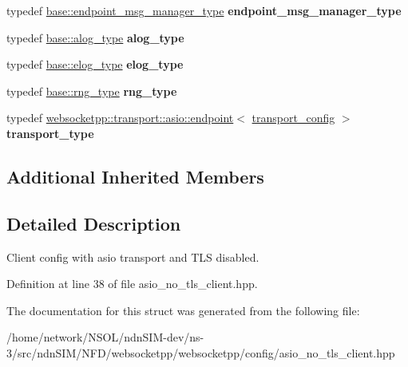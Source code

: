 \begin{DoxyCompactItemize}
\item 
typedef \hyperlink{classwebsocketpp_1_1message__buffer_1_1alloc_1_1endpoint__msg__manager}{base\+::endpoint\+\_\+msg\+\_\+manager\+\_\+type} {\bfseries endpoint\+\_\+msg\+\_\+manager\+\_\+type}\hypertarget{structwebsocketpp_1_1config_1_1asio__client_aaeb34609830b9038bff2bbe3fec9d420}{}\label{structwebsocketpp_1_1config_1_1asio__client_aaeb34609830b9038bff2bbe3fec9d420}

\item 
typedef \hyperlink{classwebsocketpp_1_1log_1_1basic}{base\+::alog\+\_\+type} {\bfseries alog\+\_\+type}\hypertarget{structwebsocketpp_1_1config_1_1asio__client_af6deeb2d0492bb8680b4e030fd201185}{}\label{structwebsocketpp_1_1config_1_1asio__client_af6deeb2d0492bb8680b4e030fd201185}

\item 
typedef \hyperlink{structwebsocketpp_1_1config_1_1core__client_a24f1bae9e8a92bf7950153ed39eaffb8}{base\+::elog\+\_\+type} {\bfseries elog\+\_\+type}\hypertarget{structwebsocketpp_1_1config_1_1asio__client_abbef282de8c085b57d8f6780f0187a1d}{}\label{structwebsocketpp_1_1config_1_1asio__client_abbef282de8c085b57d8f6780f0187a1d}

\item 
typedef \hyperlink{structwebsocketpp_1_1config_1_1core__client_adacb3a0ec249a2dea11871f299cf660f}{base\+::rng\+\_\+type} {\bfseries rng\+\_\+type}\hypertarget{structwebsocketpp_1_1config_1_1asio__client_a02b4c4dd005aa41d70a70a60e3929d37}{}\label{structwebsocketpp_1_1config_1_1asio__client_a02b4c4dd005aa41d70a70a60e3929d37}

\item 
typedef \hyperlink{classwebsocketpp_1_1transport_1_1asio_1_1endpoint}{websocketpp\+::transport\+::asio\+::endpoint}$<$ \hyperlink{structwebsocketpp_1_1config_1_1asio__client_1_1transport__config}{transport\+\_\+config} $>$ {\bfseries transport\+\_\+type}\hypertarget{structwebsocketpp_1_1config_1_1asio__client_a0995b7dc42e350f8caa99b409b2cb0a7}{}\label{structwebsocketpp_1_1config_1_1asio__client_a0995b7dc42e350f8caa99b409b2cb0a7}

\end{DoxyCompactItemize}
\subsection*{Additional Inherited Members}


\subsection{Detailed Description}
Client config with asio transport and T\+LS disabled. 

Definition at line 38 of file asio\+\_\+no\+\_\+tls\+\_\+client.\+hpp.



The documentation for this struct was generated from the following file\+:\begin{DoxyCompactItemize}
\item 
/home/network/\+N\+S\+O\+L/ndn\+S\+I\+M-\/dev/ns-\/3/src/ndn\+S\+I\+M/\+N\+F\+D/websocketpp/websocketpp/config/asio\+\_\+no\+\_\+tls\+\_\+client.\+hpp\end{DoxyCompactItemize}
